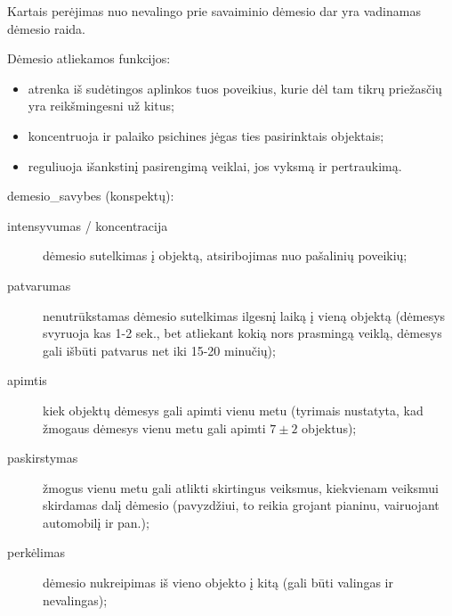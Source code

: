 Kartais perėjimas nuo nevalingo prie savaiminio dėmesio dar yra vadinamas
dėmesio raida.

Dėmesio atliekamos funkcijos:

\begin{itemize}
  \item atrenka iš sudėtingos aplinkos tuos poveikius, kurie dėl tam tikrų
    priežasčių yra reikšmingesni už kitus;
  \item koncentruoja ir palaiko psichines jėgas ties pasirinktais objektais;
  \item reguliuoja išankstinį pasirengimą veiklai, jos vyksmą ir 
    pertraukimą.
\end{itemize}





\label{tema:demesio_savybes}

\Glspl{demesio_savybe} (konspektų):

\begin{description}
  \item[intensyvumas / koncentracija] dėmesio sutelkimas į objektą, 
    atsiribojimas nuo pašalinių poveikių;
  \item[patvarumas] nenutrūkstamas dėmesio sutelkimas ilgesnį laiką 
    į vieną objektą (dėmesys svyruoja kas 1-2 sek., bet atliekant kokią
    nors prasmingą veiklą, dėmesys gali išbūti patvarus net iki 15-20 
    minučių);
  \item[apimtis] kiek objektų dėmesys gali apimti vienu metu (tyrimais
    nustatyta, kad žmogaus dėmesys vienu metu gali apimti $7 \pm 2$ 
    objektus);
  \item[paskirstymas] žmogus vienu metu gali atlikti skirtingus veiksmus,
    kiekvienam veiksmui skirdamas dalį dėmesio (pavyzdžiui, to reikia 
    grojant pianinu, vairuojant automobilį ir pan.);
  \item[perkėlimas] dėmesio nukreipimas iš vieno objekto į kitą
    (gali būti valingas ir nevalingas);
\end{description}

